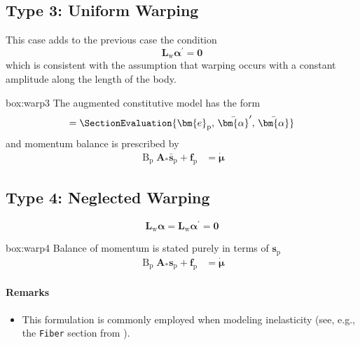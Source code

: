 %

\subsection{Type 3: Uniform Warping}
This case adds to the previous case the condition 
\[
\mathbf{L}_{\mathrm{w}} \bm{\alpha}^{\prime}=\bm{0}
\]
which is consistent with the assumption that warping occurs with a constant amplitude along the length of the body. 

\vspace{1ex}
\begin{ambox}{box:warp3}
The augmented constitutive model has the form
\begin{equation*}
[\bar{\bm{s}}_{\mathrm{p}}, \bar{\bimoment},\bar{\bishear}] = \SectionEvaluation{\bm{e}_{\mathrm{p}},\, \bar{\bm{\alpha}}',\, \bar{\bm{\alpha}}
}
\end{equation*}
and momentum balance is prescribed by
\begin{equation}
\begin{aligned}
    \operatorname{B}_{\mathrm{p}} \bm{A}_* \bar{\bm{s}}_{\mathrm{p}} + \bm{f}_{\mathrm{p}} &= \dot{\bm{\mu}}
\end{aligned}
\end{equation}
\end{ambox}

\subsection{Type 4: Neglected Warping}
\[
\mathbf{L}_{\mathrm{w}} \bm{\alpha} =\mathbf{L}_{\mathrm{w}} \bm{\alpha}^{\prime}=\bm{0}
\]
\begin{ambox}{box:warp4}
Balance of momentum is stated purely in terms of \(\bm{s}_{\mathrm{p}}\)
\begin{equation}
\begin{aligned}
    \operatorname{B}_{\mathrm{p}} \bm{A}_* \bm{s}_{\mathrm{p}}+ \bm{f}_{\mathrm{p}} &= \dot{\bm{\mu}}
\end{aligned}
\end{equation}
\end{ambox}

\paragraph{Remarks}
\begin{itemize}
    \item This formulation is commonly employed when modeling inelasticity (see, e.g., the \texttt{Fiber} section from \OpenSees{}).
\end{itemize}

